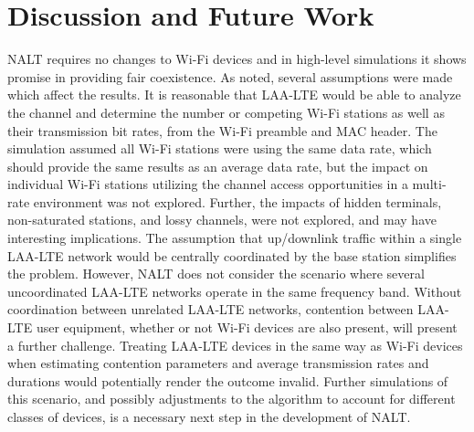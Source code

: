 \section{Discussion and Future Work}
\label{future-work}
NALT requires no changes to \mbox{Wi-Fi} devices and in high-level simulations it shows promise in providing fair coexistence. As noted, several assumptions were made which affect the results.  It is reasonable that \mbox{LAA-LTE} would be able to analyze the channel and determine the number or competing \mbox{Wi-Fi} stations as well as their transmission bit rates, from the \mbox{Wi-Fi} preamble and MAC header.  The simulation assumed all \mbox{Wi-Fi} stations were using the same data rate, which should provide the same results as an average data rate, but the impact on individual \mbox{Wi-Fi} stations utilizing the channel access opportunities in a multi-rate environment was not explored.  Further, the impacts of hidden terminals, non-saturated stations, and lossy channels, were not explored, and may have interesting implications. The assumption that up/downlink traffic within a single \mbox{LAA-LTE} network would be centrally coordinated by the base station simplifies the problem. However, NALT does not consider the scenario where several uncoordinated \mbox{LAA-LTE} networks operate in the same frequency band.  Without coordination between unrelated \mbox{LAA-LTE} networks, contention between \mbox{LAA-LTE} user equipment, whether or not \mbox{Wi-Fi} devices are also present, will present a further challenge. Treating \mbox{LAA-LTE} devices in the same way as \mbox{Wi-Fi} devices when estimating contention parameters and average transmission rates and durations would potentially render the outcome invalid.  Further simulations of this scenario, and possibly adjustments to the algorithm to account for different classes of devices, is a necessary next step in the development of NALT.


